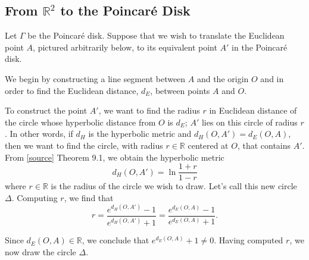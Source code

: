 \documentclass[12pt]{article}
\newcommand{\R}{\mathbb{R}}
\newcommand{\poincare}{Poincar\'{e} }
\theoremstyle{plain}
\theoremstyle{definition}
\newcommand{\todo}[1]{\color{magenta} \text{{#1}} \color{black}}
\begin{document}
\newpage
\begin{appendices}
\section{From $\R^2$ to the \poincare Disk} \label{appendixA}

Let $\Gamma$ be the \poincare disk. Suppose that we wish to translate the Euclidean point $A$, pictured arbitrarily below, to its equivalent point $A'$ in the \poincare disk.

\begin{center}
\end{center}

We begin by constructing a line segment between $A$ and the origin $O$ and in order to find the Euclidean distance, $d_E$, between points $A$ and $O$.

\begin{center}
\end{center}

To construct the point $A'$, we want to find the radius $r$ in Euclidean distance of the circle whose hyperbolic distance from $O$ is $d_E$; $A'$ lies on this circle of radius $r$. In other words, if $d_H$ is the hyperbolic metric and $d_H(O,A') = d_E(O,A)$, then we want to find the circle, with radius $r\in\R$ centered at $O$, that contains $A'$. From \href{}{[source]} Theorem 9.1, we obtain the hyperbolic metric
\[
	d_H(O,A') = \ln\frac{1 + r}{1 - r}
\]
where $r\in\R$ is the radius of the circle we wish to draw. Let's call this new circle $\Delta$. Computing $r$, we find that
\[
	r = \frac{e^{d_H(O,A')} - 1}{e^{d_H(O,A')} + 1} =  \frac{e^{d_E(O,A)} - 1}{e^{d_E(O,A)} + 1}.
\]

Since $d_E(O,A)\in\R$, we conclude that $e^{d_E(O,A)} + 1 \neq 0$. Having computed $r$, we now draw the circle $\Delta$. \todo{[LG] add point $B$ (from Karen's comments)}


\end{appendices}
\end{document}
